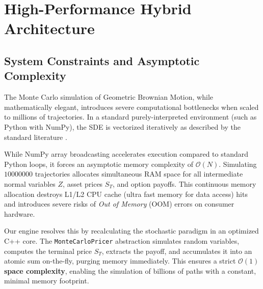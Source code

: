 \chapter{High-Performance Hybrid Architecture}

\section{System Constraints and Asymptotic Complexity}

The Monte Carlo simulation of Geometric Brownian Motion, while mathematically elegant, introduces severe computational bottlenecks when scaled to millions of trajectories. In a standard purely-interpreted environment (such as Python with NumPy), the SDE is vectorized iteratively as described by the standard literature \cite{hilpisch2018python}. 

While NumPy array broadcasting accelerates execution compared to standard Python loops, it forces an asymptotic memory complexity of \(\mathcal{O}(N)\). Simulating \(10000000\) trajectories allocates simultaneous RAM space for all intermediate normal variables \(Z\), asset prices \(S_T\), and option payoffs. This continuous memory allocation destroys L1/L2 CPU cache (ultra fast memory for data access) hits and introduces severe risks of \textit{Out of Memory} (OOM) errors on consumer hardware.

Our engine resolves this by recalculating the stochastic paradigm in an optimized C++ core. The \texttt{MonteCarloPricer} abstraction simulates random variables, computes the terminal price \(S_T\), extracts the payoff, and accumulates it into an atomic sum on-the-fly, purging memory immediately. This ensures a strict \textbf{\(\mathcal{O}(1)\) space complexity}, enabling the simulation of billions of paths with a constant, minimal memory footprint.

